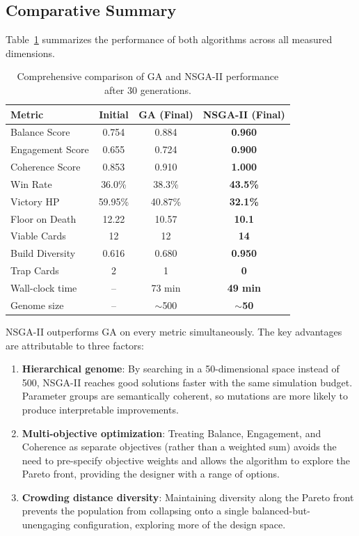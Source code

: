 \subsection{Comparative Summary}

Table~\ref{tab:comparison} summarizes the performance of both algorithms across all measured dimensions.

\begin{table}[H]
    \centering
    \caption{Comprehensive comparison of GA and NSGA-II performance after 30 generations.}
    \label{tab:comparison}
    \begin{tabular}{lccc}
        \toprule
        \textbf{Metric} & \textbf{Initial} & \textbf{GA (Final)} & \textbf{NSGA-II (Final)} \\
        \midrule
        Balance Score   & 0.754 & 0.884 & \textbf{0.960} \\
        Engagement Score & 0.655 & 0.724 & \textbf{0.900} \\
        Coherence Score & 0.853 & 0.910 & \textbf{1.000} \\
        Win Rate        & 36.0\% & 38.3\% & \textbf{43.5\%} \\
        Victory HP      & 59.95\% & 40.87\% & \textbf{32.1\%} \\
        Floor on Death  & 12.22 & 10.57 & \textbf{10.1} \\
        Viable Cards    & 12 & 12 & \textbf{14} \\
        Build Diversity & 0.616 & 0.680 & \textbf{0.950} \\
        Trap Cards      & 2 & 1 & \textbf{0} \\
        Wall-clock time & -- & 73 min & \textbf{49 min} \\
        Genome size     & -- & $\sim$500 & \textbf{$\sim$50} \\
        \bottomrule
    \end{tabular}
\end{table}

NSGA-II outperforms GA on every metric simultaneously. The key advantages are attributable to three factors:
\begin{enumerate}
    \item \textbf{Hierarchical genome}: By searching in a 50-dimensional space instead of 500, NSGA-II reaches good solutions faster with the same simulation budget. Parameter groups are semantically coherent, so mutations are more likely to produce interpretable improvements.
    \item \textbf{Multi-objective optimization}: Treating Balance, Engagement, and Coherence as separate objectives (rather than a weighted sum) avoids the need to pre-specify objective weights and allows the algorithm to explore the Pareto front, providing the designer with a range of options.
    \item \textbf{Crowding distance diversity}: Maintaining diversity along the Pareto front prevents the population from collapsing onto a single balanced-but-unengaging configuration, exploring more of the design space.
\end{enumerate}

